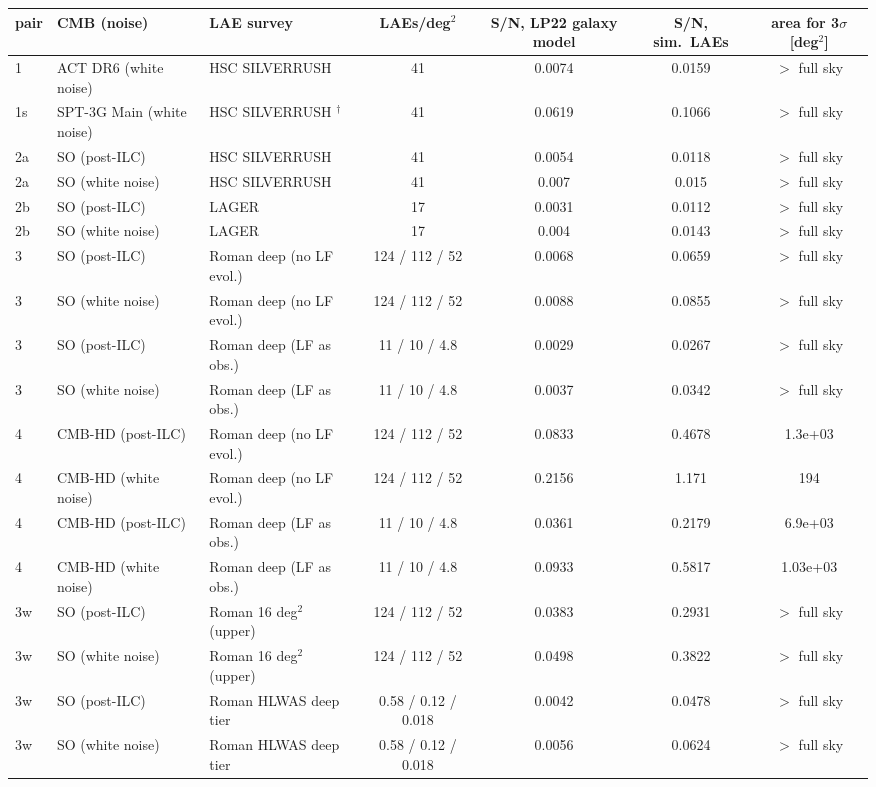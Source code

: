 \begin{tabular}{lllcccc}
\toprule
pair & CMB (noise) & LAE survey & LAEs/deg$^2$ & S/N, LP22 galaxy model & S/N, sim.\ LAEs & area for 3$\sigma$ [deg$^2$] \\
\midrule
1 & ACT DR6 (white noise) & HSC SILVERRUSH & 41 & 0.0074 & 0.0159 & $>$ full sky \\
1s & SPT-3G Main (white noise) & HSC SILVERRUSH $^\dagger$ & 41 & 0.0619 & 0.1066 & $>$ full sky \\
2a & SO (post-ILC) & HSC SILVERRUSH & 41 & 0.0054 & 0.0118 & $>$ full sky \\
2a & SO (white noise) & HSC SILVERRUSH & 41 & 0.007 & 0.015 & $>$ full sky \\
2b & SO (post-ILC) & LAGER & 17 & 0.0031 & 0.0112 & $>$ full sky \\
2b & SO (white noise) & LAGER & 17 & 0.004 & 0.0143 & $>$ full sky \\
3 & SO (post-ILC) & Roman deep (no LF evol.) & 124 / 112 / 52 & 0.0068 & 0.0659 & $>$ full sky \\
3 & SO (white noise) & Roman deep (no LF evol.) & 124 / 112 / 52 & 0.0088 & 0.0855 & $>$ full sky \\
3 & SO (post-ILC) & Roman deep (LF as obs.) & 11 / 10 / 4.8 & 0.0029 & 0.0267 & $>$ full sky \\
3 & SO (white noise) & Roman deep (LF as obs.) & 11 / 10 / 4.8 & 0.0037 & 0.0342 & $>$ full sky \\
4 & CMB-HD (post-ILC) & Roman deep (no LF evol.) & 124 / 112 / 52 & 0.0833 & 0.4678 & 1.3e+03 \\
4 & CMB-HD (white noise) & Roman deep (no LF evol.) & 124 / 112 / 52 & 0.2156 & 1.171 & 194 \\
4 & CMB-HD (post-ILC) & Roman deep (LF as obs.) & 11 / 10 / 4.8 & 0.0361 & 0.2179 & 6.9e+03 \\
4 & CMB-HD (white noise) & Roman deep (LF as obs.) & 11 / 10 / 4.8 & 0.0933 & 0.5817 & 1.03e+03 \\
3w & SO (post-ILC) & Roman 16 deg$^2$ (upper) & 124 / 112 / 52 & 0.0383 & 0.2931 & $>$ full sky \\
3w & SO (white noise) & Roman 16 deg$^2$ (upper) & 124 / 112 / 52 & 0.0498 & 0.3822 & $>$ full sky \\
3w & SO (post-ILC) & Roman HLWAS deep tier & 0.58 / 0.12 / 0.018 & 0.0042 & 0.0478 & $>$ full sky \\
3w & SO (white noise) & Roman HLWAS deep tier & 0.58 / 0.12 / 0.018 & 0.0056 & 0.0624 & $>$ full sky \\

\end{tabular}
